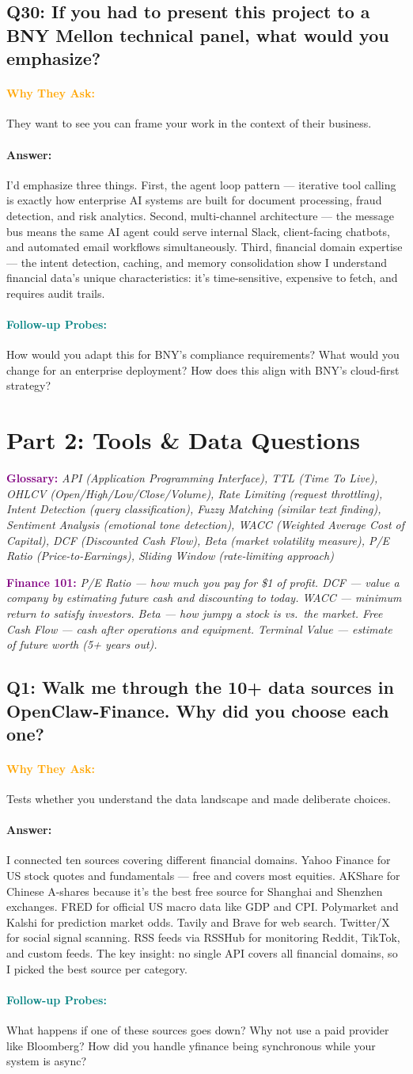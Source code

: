 \documentclass[11pt,a4paper]{article}
\newcommand{\Q}[1]{\subsection{#1}}
\newcommand{\Ans}[1]{\paragraph{\textbf{Answer:}} #1}
\newcommand{\Why}{\paragraph{\textcolor{orange}{\textbf{Why They Ask:}}}}
\newcommand{\Probe}{\paragraph{\textcolor{teal}{\textbf{Follow-up Probes:}}}}
\begin{document}
\Q{Q30: If you had to present this project to a BNY Mellon technical panel, what would you emphasize?}
\Why They want to see you can frame your work in the context of their business.
\Ans I'd emphasize three things. First, the agent loop pattern --- iterative tool calling is exactly how enterprise AI systems are built for document processing, fraud detection, and risk analytics. Second, multi-channel architecture --- the message bus means the same AI agent could serve internal Slack, client-facing chatbots, and automated email workflows simultaneously. Third, financial domain expertise --- the intent detection, caching, and memory consolidation show I understand financial data's unique characteristics: it's time-sensitive, expensive to fetch, and requires audit trails.
\Probe How would you adapt this for BNY's compliance requirements? What would you change for an enterprise deployment? How does this align with BNY's cloud-first strategy?

\newpage
\section{Part 2: Tools \& Data Questions}

\textcolor{purple}{\textbf{Glossary:}} \textit{API (Application Programming Interface), TTL (Time To Live), OHLCV (Open/High/Low/Close/Volume), Rate Limiting (request throttling), Intent Detection (query classification), Fuzzy Matching (similar text finding), Sentiment Analysis (emotional tone detection), WACC (Weighted Average Cost of Capital), DCF (Discounted Cash Flow), Beta (market volatility measure), P/E Ratio (Price-to-Earnings), Sliding Window (rate-limiting approach)}

\textcolor{purple}{\textbf{Finance 101:}} \textit{P/E Ratio --- how much you pay for \$1 of profit. DCF --- value a company by estimating future cash and discounting to today. WACC --- minimum return to satisfy investors. Beta --- how jumpy a stock is vs.\ the market. Free Cash Flow --- cash after operations and equipment. Terminal Value --- estimate of future worth (5+ years out).}

\Q{Q1: Walk me through the 10+ data sources in OpenClaw-Finance. Why did you choose each one?}
\Why Tests whether you understand the data landscape and made deliberate choices.
\Ans I connected ten sources covering different financial domains. Yahoo Finance for US stock quotes and fundamentals --- free and covers most equities. AKShare for Chinese A-shares because it's the best free source for Shanghai and Shenzhen exchanges. FRED for official US macro data like GDP and CPI. Polymarket and Kalshi for prediction market odds. Tavily and Brave for web search. Twitter/X for social signal scanning. RSS feeds via RSSHub for monitoring Reddit, TikTok, and custom feeds. The key insight: no single API covers all financial domains, so I picked the best source per category.
\Probe What happens if one of these sources goes down? Why not use a paid provider like Bloomberg? How did you handle yfinance being synchronous while your system is async?
\end{document}

